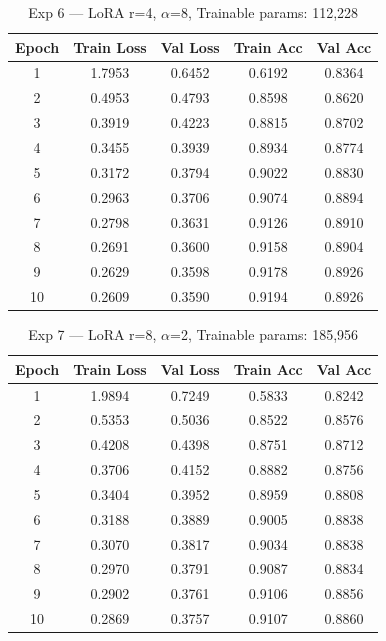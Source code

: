 \documentclass[12pt,a4paper]{article}
\begin{document}
\begin{table}[H]
\centering
\caption{Exp 6 — LoRA r=4, $\alpha$=8, Trainable params: 112,228}
\small
\begin{tabular}{ccccc}
\toprule
Epoch & Train Loss & Val Loss & Train Acc & Val Acc \\ \midrule
1  & 1.7953 & 0.6452 & 0.6192 & 0.8364 \\
2  & 0.4953 & 0.4793 & 0.8598 & 0.8620 \\
3  & 0.3919 & 0.4223 & 0.8815 & 0.8702 \\
4  & 0.3455 & 0.3939 & 0.8934 & 0.8774 \\
5  & 0.3172 & 0.3794 & 0.9022 & 0.8830 \\
6  & 0.2963 & 0.3706 & 0.9074 & 0.8894 \\
7  & 0.2798 & 0.3631 & 0.9126 & 0.8910 \\
8  & 0.2691 & 0.3600 & 0.9158 & 0.8904 \\
9  & 0.2629 & 0.3598 & 0.9178 & 0.8926 \\
10 & 0.2609 & 0.3590 & 0.9194 & 0.8926 \\
\bottomrule
\end{tabular}
\end{table}

\begin{table}[H]
\centering
\caption{Exp 7 — LoRA r=8, $\alpha$=2, Trainable params: 185,956}
\small
\begin{tabular}{ccccc}
\toprule
Epoch & Train Loss & Val Loss & Train Acc & Val Acc \\ \midrule
1  & 1.9894 & 0.7249 & 0.5833 & 0.8242 \\
2  & 0.5353 & 0.5036 & 0.8522 & 0.8576 \\
3  & 0.4208 & 0.4398 & 0.8751 & 0.8712 \\
4  & 0.3706 & 0.4152 & 0.8882 & 0.8756 \\
5  & 0.3404 & 0.3952 & 0.8959 & 0.8808 \\
6  & 0.3188 & 0.3889 & 0.9005 & 0.8838 \\
7  & 0.3070 & 0.3817 & 0.9034 & 0.8838 \\
8  & 0.2970 & 0.3791 & 0.9087 & 0.8834 \\
9  & 0.2902 & 0.3761 & 0.9106 & 0.8856 \\
10 & 0.2869 & 0.3757 & 0.9107 & 0.8860 \\
\bottomrule
\end{tabular}
\end{table}
\end{document}
